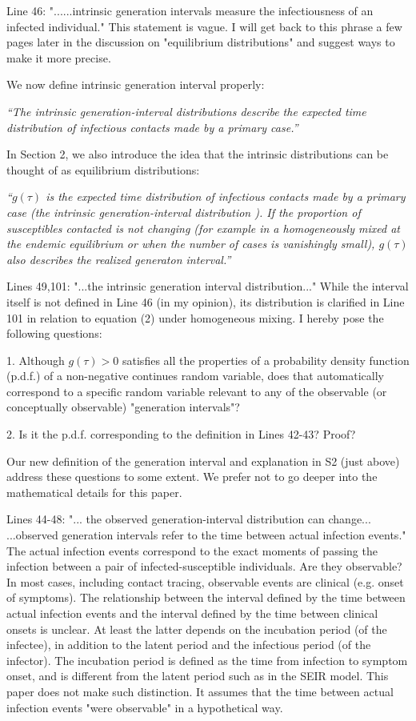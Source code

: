 \documentclass[12pt]{article}
\newcommand{\revtext}{\textsf}
\newcommand{\newtext}[1]{\textsl{``#1''}}
\begin{document}
\revtext{Line 46: "......intrinsic generation intervals measure the infectiousness of an
infected individual." This statement is vague. I will get back to this phrase
a few pages later in the discussion on "equilibrium distributions" and
suggest ways to make it more precise.}

We now define intrinsic generation interval properly:

\newtext{The \emph{intrinsic} generation-interval distributions describe the expected time distribution of infectious contacts made by a primary case.}

In Section 2, we also introduce the idea that the intrinsic distributions can be thought of as equilibrium distributions:

\newtext{$g(\tau)$ is the expected time distribution of infectious contacts made by a primary case (the intrinsic generation-interval distribution \citep{champredon2015intrinsic}).
If the proportion of susceptibles contacted is not changing (for example in a homogeneously mixed at the endemic equilibrium or when the number of cases is vanishingly small), $g(\tau)$ also describes the realized generaton interval.}

\revtext{Lines 49,101: "...the intrinsic generation interval distribution..." While the
interval itself is not defined in Line 46 (in my opinion), its distribution is
clarified in Line 101 in relation to equation (2) under homogeneous mixing.
I hereby pose the following questions:}

\revtext{
1. Although $g(\tau) > 0$ satisfies all the properties of a probability density
function (p.d.f.) of a non-negative continues random variable, does that
automatically correspond to a specific random variable relevant to any of
the observable (or conceptually observable) "generation intervals"?
}

\revtext{
2. Is it the p.d.f. corresponding to the definition in Lines 42-43? Proof?
}

Our new definition of the generation interval and explanation in S2 (just above) address these questions to some extent. We prefer not to go deeper into the mathematical details for this paper.

\revtext{
Lines 44-48: "... the observed generation-interval distribution can change...
...observed generation intervals refer to the time between actual infection
events." The actual infection events correspond to the exact moments of
passing the infection between a pair of infected-susceptible individuals.
Are they observable? In most cases, including contact tracing, observable
events are clinical (e.g. onset of symptoms). The relationship between
the interval defined by the time between actual infection events and the
interval defined by the time between clinical onsets is unclear. At least the
latter depends on the incubation period (of the infectee), in addition to the
latent period and the infectious period (of the infector). The incubation
period is defined as the time from infection to symptom onset, and is
different from the latent period such as in the SEIR model. This paper
does not make such distinction. It assumes that the time between actual
infection events "were observable" in a hypothetical way.
}
\end{document}

